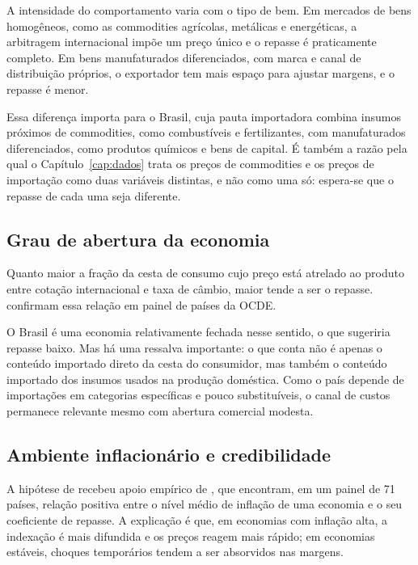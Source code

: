\documentclass[12pt,openright,oneside,a4paper,portuguese,brazil]{abntex2}
\begin{document}
A intensidade do comportamento varia com o tipo de bem. Em mercados de bens
homogêneos, como as commodities agrícolas, metálicas e energéticas, a arbitragem
internacional impõe um preço único e o repasse é praticamente completo. Em bens
manufaturados diferenciados, com marca e canal de distribuição próprios, o
exportador tem mais espaço para ajustar margens, e o repasse é menor.

Essa diferença importa para o Brasil, cuja pauta importadora combina insumos
próximos de commodities, como combustíveis e fertilizantes, com manufaturados
diferenciados, como produtos químicos e bens de capital. É também a razão pela
qual o Capítulo~\ref{cap:dados} trata os preços de commodities e os preços de
importação como duas variáveis distintas, e não como uma só: espera-se que o
repasse de cada uma seja diferente.

\subsection{Grau de abertura da economia}
\label{sec:abertura}

Quanto maior a fração da cesta de consumo cujo preço está atrelado ao produto
entre cotação internacional e taxa de câmbio, maior tende a ser o repasse.
 confirmam essa relação em painel de países da OCDE.

O Brasil é uma economia relativamente fechada nesse sentido, o que sugeriria
repasse baixo. Mas há uma ressalva importante: o que conta não é
apenas o conteúdo importado direto da cesta do consumidor, mas também o
conteúdo importado dos insumos usados na produção doméstica. Como o país depende
de importações em categorias específicas e pouco substituíveis, o canal de
custos permanece relevante mesmo com abertura comercial modesta.

\subsection{Ambiente inflacionário e credibilidade}
\label{sec:credibilidade}

A hipótese de  recebeu apoio empírico de
, que encontram, em um painel de 71 países, relação
positiva entre o nível médio de inflação de uma economia e o seu coeficiente de
repasse. A explicação é que, em economias com inflação alta, a indexação é mais
difundida e os preços reagem mais rápido; em economias estáveis, choques
temporários tendem a ser absorvidos nas margens.
\end{document}
